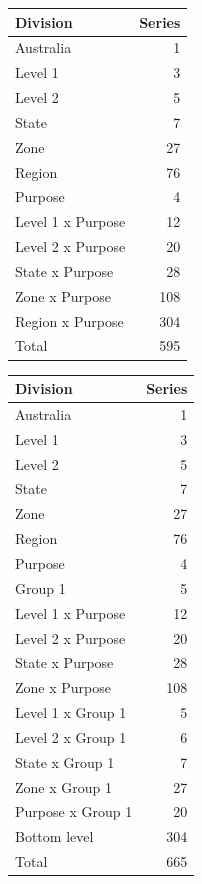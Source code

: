 \documentclass[11pt,a4paper,]{article}
\let\origtable\table
\let\endorigtable\endtable
\renewenvironment{table}[1][2] {
    \expandafter\origtable\expandafter[!htbp]
} {
    \endorigtable
}
\begin{document}
\begin{table}[!h]

\caption{\label{tab:simlevel1level2}Number of simulated Australian domestic tourism series at each aggregation level - adding two hierarchy variables (Level 1 and Level 2)}
\centering
\begin{tabular}[t]{lr}
\toprule
Division & Series\\
\midrule
Australia & 1\\
Level 1 & 3\\
Level 2 & 5\\
State & 7\\
Zone & 27\\
Region & 76\\
Purpose & 4\\
Level 1 x Purpose & 12\\
Level 2 x Purpose & 20\\
State x Purpose & 28\\
Zone x Purpose & 108\\
Region x Purpose & 304\\
\hline
Total & 595\\
\bottomrule
\end{tabular}
\end{table}

\begin{table}[!h]

\caption{\label{tab:simlevel1level2group1}Number of simulated Australian domestic tourism series at each aggregation level - adding two hierarchy and one grouping variables (Level 1, Level 2 and Group 1)}
\centering
\begin{tabular}[t]{lr}
\toprule
Division & Series\\
\midrule
Australia & 1\\
Level 1 & 3\\
Level 2 & 5\\
State & 7\\
Zone & 27\\
Region & 76\\
Purpose & 4\\
Group 1 & 5\\
Level 1 x Purpose & 12\\
Level 2 x Purpose & 20\\
State x Purpose & 28\\
Zone x Purpose & 108\\
Level 1 x Group 1 & 5\\
Level 2 x Group 1 & 6\\
State x Group 1 & 7\\
Zone x Group 1 & 27\\
Purpose x Group 1 & 20\\
Bottom level & 304\\
\hline
Total & 665\\
\bottomrule
\end{tabular}
\end{table}
\end{document}
